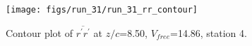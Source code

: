 \begin{figure}[H]
\centering
\texttt{[image: figs/run\_31/run\_31\_rr\_contour]}
\caption{Contour plot of $\overline{r^\prime r^\prime}$ at $z/c$=8.50, $V_{free}$=14.86, station 4.}
\label{fig:run_31_rr_contour}
\end{figure}


